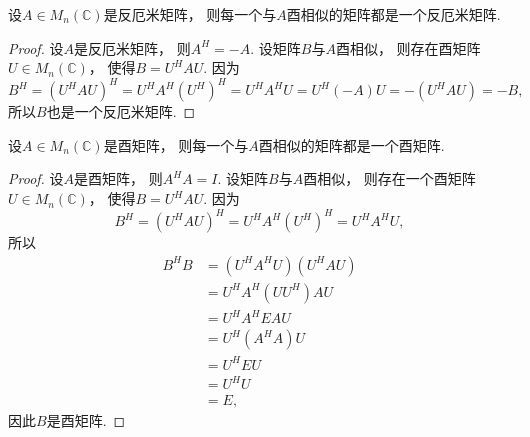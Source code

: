 \begin{example}
设\(A \in M_n(\mathbb{C})\)是反厄米矩阵，
则每一个与\(A\)酉相似的矩阵都是一个反厄米矩阵.
\begin{proof}
设\(A\)是反厄米矩阵，
则\(A^H = -A\).
设矩阵\(B\)与\(A\)酉相似，
则存在酉矩阵\(U \in M_n(\mathbb{C})\)，
使得\(B = U^H A U\).
因为\begin{equation*}
	B^H = (U^H A U)^H
	= U^H A^H (U^H)^H
	= U^H A^H U
	= U^H (-A) U
	= -(U^H A U)
	= -B,
\end{equation*}
所以\(B\)也是一个反厄米矩阵.
\end{proof}
\end{example}

\begin{example}
设\(A \in M_n(\mathbb{C})\)是酉矩阵，
则每一个与\(A\)酉相似的矩阵都是一个酉矩阵.
\begin{proof}
设\(A\)是酉矩阵，
则\(A^H A = I\).
设矩阵\(B\)与\(A\)酉相似，
则存在一个酉矩阵\(U \in M_n(\mathbb{C})\)，
使得\(B = U^H A U\).
因为\begin{equation*}
	B^H = (U^H A U)^H
	= U^H A^H (U^H)^H
	= U^H A^H U,
\end{equation*}
所以\begin{align*}
	B^H B &= (U^H A^H U) (U^H A U) \\
	&= U^H A^H (U U^H) A U \\
	&= U^H A^H E A U \\
	&= U^H (A^H A) U \\
	&= U^H E U \\
	&= U^H U \\
	&= E,
\end{align*}
因此\(B\)是酉矩阵.
\end{proof}
\end{example}
